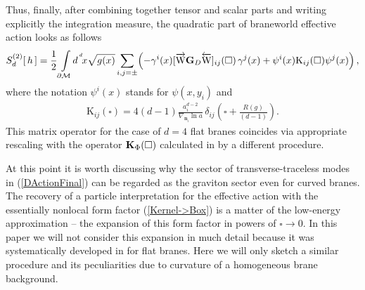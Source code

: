 \documentclass[a4paper,12pt]{article}
\newcommand{\ddim}{{d}}
\newcommand{\dM}{{\partial \cal M}}
\newcommand{\dx}{{d^{^{\,\ddim}} \!x}}
\newcommand{\un}{\mathbf n} %
\newcommand{\bBox}{\square}  %
\newcommand{\Bnabla}{\nabla}  %
\newcommand{\NGrDN}{\overrightarrow{\mathrm{W}}\mathbf{G}_{D}\overleftarrow{\mathrm{W}}} %
\newcommand{\RnGrDnR}{{\NGrDN}} %
\begin{document}
Thus, finally, after combining together tensor and scalar parts
and writing explicitly the integration measure, the quadratic part
of braneworld effective action looks as follows
    \begin{eqnarray}
     S^{(2)}_\ddim[\,h\,]= \frac12\int
     \limits_{\dM}\!\dx \sqrt{g(x)}
     \sum_{i,j=\pm}\!\left(-\gamma^i(x)
     [{\RnGrDnR}]_{ij}(\bBox)\,
     \gamma^j(x)+\psi^i(x)
     \mathrm{K}_{ij}(\bBox)
     \psi^j(x)\right),               \label{DActionFinal}
    \end{eqnarray}
where the notation $\psi^i(x)$ stands for $\psi(x,y_i)$ and
    \begin{eqnarray}
     \mathrm{K}_{ij}(\bBox)=
     4(\ddim-1)\frac{a_i^{\ddim-2}}
     {\Bnabla_{\un_i}\!\ln{a}}\,
     \delta_{ij}\left(\bBox+\frac{R(g)}
     {(\ddim-1)}\right).             \label{DilatonMatrix}
    \end{eqnarray}
This matrix operator for the case of $\ddim=4$ flat branes
coincides via appropriate rescaling with the operator ${\bf
K}_\Phi(\bBox)$ calculated in \cite{BWEA} by a different
procedure.

At this point it is worth discussing why the sector of
transverse-traceless modes in (\ref{DActionFinal}) can be regarded
as the graviton sector even for curved branes. The recovery of a
particle interpretation for the effective action with the
essentially nonlocal form factor (\ref{Kernel->Box}) is a matter
of the low-energy approximation -- the expansion of this form
factor in powers of $\bBox\to 0$. In this paper we will not
consider this expansion in much detail because it was
systematically developed in \cite{BWEA} for flat branes. Here we
will only sketch a similar procedure and its peculiarities due to
curvature of a homogeneous brane background.
\end{document}
